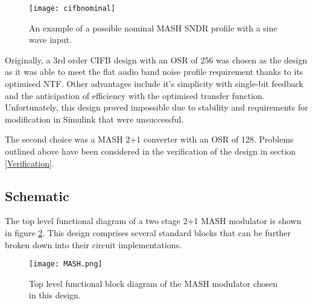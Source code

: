 \begin{figure}
    \begin{center}
    \texttt{[image: cifbnominal]}
    \label{fig:cifbnominal}
    \caption{An example of a possible nominal MASH SNDR profile with a sine wave input.}
    \end{center}
\end{figure}


Originally, a 3rd order CIFB design with an OSR of 256 was chosen as the design as it was able to meet the flat audio band noise profile requirement thanks to its optimised NTF.
Other advantages include it's simplicity with single-bit feedback and the anticipation of efficiency with the optimised transfer function.
Unfortunately, this design proved impossible due to stability and requirements for modification in Simulink that were unsuccessful.

The second choice was a MASH 2+1 converter with an OSR of 128.
Problems outlined above have been considered in the verification of the design in section \ref{Verification}.


    \subsection{Schematic}
    \label{Design:schematic}
    The top level functional diagram of a two stage 2+1 MASH modulator is shown in figure \ref{fig:MASH}.
    This design comprises several standard blocks that can be further broken down into their circuit implementations.

    \begin{figure}
        \begin{center}
        \texttt{[image: MASH.png]}
        \label{fig:MASH}
        \caption{Top level functional block diagram of the MASH modulator chosen in this design.}
        \end{center}
    \end{figure}

